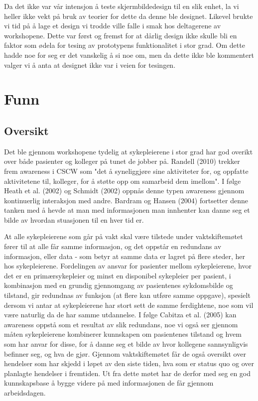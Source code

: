 \noindent
Da det ikke var vår intensjon å teste skjermbildedesign til en slik enhet, la vi heller ikke vekt på bruk av teorier for dette da denne ble designet. Likevel brukte vi tid på å lage et design vi trodde ville falle i smak hos deltagerene av workshopene. Dette var først og fremst for at dårlig design ikke skulle bli en faktor som ødela for tesing av prototypens funktionalitet i stor grad. Om dette hadde noe for seg er det vanskelig å si noe om, men da dette ikke ble kommentert valger vi å anta at designet ikke var i veien for tesingen.

\section{Funn}

\subsection{Oversikt}
\label{oversikt}
Det ble gjennom workshopene tydelig at sykepleierene i stor grad har god overikt over både pasienter og kolleger på tunet de jobber på. Randell (2010) trekker frem awareness i CSCW som "det å syneliggjøre sine aktiviteter for, og oppfatte aktivitetene til, kolleger, for å støtte opp om samarbeid dem imellom". I følge Heath et al. (2002) og Schmidt (2002) oppnås denne typen awareness gjennom kontinuerlig interaksjon med andre. Bardram og Hansen (2004) fortsetter denne tanken med å hevde at man med informasjonen man innhenter kan danne seg et bilde av hvordan stuasjonen til en hver tid er.

\noindent
At alle sykepleierene som går på vakt skal være tilstede under vaktskiftemøtet fører til at alle får samme informasjon, og det oppstår en redundans av informasjon, eller data - som betyr at samme data er lagret på flere steder, her hos sykepleierene. Fordelingen av ansvar for pasienter mellom sykepleierene, hvor det er en primærsykepleier og minst en disponibel sykepleier per pasient, i kombinasjon med en grundig gjennomgang av pasientenes sykdomsbilde og tilstand, gir redundnas av funksjon (at flere kan utføre samme oppgave), spesielt dersom vi antar at sykepleierene har stort sett de samme ferdightene, noe som vil være naturlig da de har samme utdannelse. I følge Cabitza et al. (2005) kan awareness oppstå som et resultat av slik redundans, noe vi også ser gjennom måten sykepleierene kombinerer kunnskapen om pasientenes tilstand og hvem som har anvar for disse, for å danne seg et bilde av hvor kollegene sannsynligvis befinner seg, og hva de gjør.
Gjennom vaktskiftemøtet får de også oversikt over hendelser som har skjedd i løpet av den siste tiden, hva som er status quo og over planlagte hendelser i fremtiden. Ut fra dette møtet har de derfor med seg en god kunnskapsbase å bygge videre på med informasjonen de får gjennom arbeidsdagen. 

